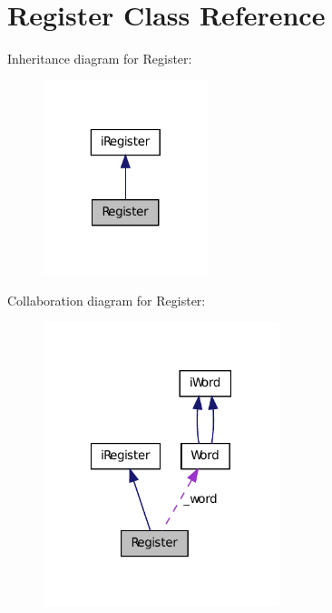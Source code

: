 \hypertarget{classRegister}{
\section{Register Class Reference}
\label{classRegister}
}


Inheritance diagram for Register:\nopagebreak
\begin{figure}[H]
\begin{center}
\leavevmode
\includegraphics[width=136pt]{classRegister__inherit__graph}
\end{center}
\end{figure}


Collaboration diagram for Register:\nopagebreak
\begin{figure}[H]
\begin{center}
\leavevmode
\includegraphics[width=195pt]{classRegister__coll__graph}
\end{center}
\end{figure}
